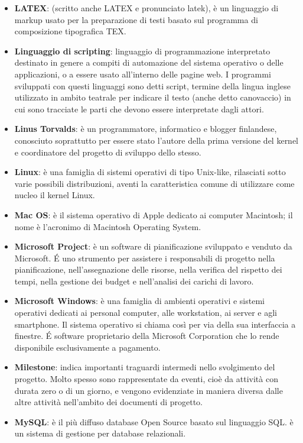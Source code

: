 \begin{itemize}
\item[] \textbf{LATEX}:  (scritto anche LATEX e pronunciato latek), è un linguaggio di markup usato per la preparazione di testi basato sul programma di composizione tipografica TEX.
\item[] \textbf{Linguaggio di scripting}: linguaggio di programmazione interpretato destinato in genere a compiti di automazione del sistema operativo o delle applicazioni, o a essere usato all'interno delle pagine web. I programmi sviluppati con questi linguaggi sono detti script, termine della lingua inglese utilizzato in ambito teatrale per indicare il testo (anche detto canovaccio) in cui sono tracciate le parti che devono essere interpretate dagli attori.
\item[] \textbf{Linus Torvalds}: è un programmatore, informatico e blogger finlandese, conosciuto soprattutto per essere stato l'autore della prima versione del kernel  e coordinatore del progetto di sviluppo dello stesso.
\item[] \textbf{Linux}: è una famiglia di sistemi operativi di tipo Unix-like, rilasciati sotto varie possibili distribuzioni, aventi la caratteristica comune di utilizzare come nucleo il kernel Linux.
\end{itemize}
\newpage

\begin{itemize}
\item[] \textbf{Mac OS}: è il sistema operativo di Apple dedicato ai computer Macintosh; il nome è l'acronimo di Macintosh Operating System.
\item[] \textbf{Microsoft Project}: è un software di pianificazione sviluppato e venduto da Microsoft. \'E uno strumento per assistere i responsabili di progetto nella pianificazione, nell'assegnazione delle risorse, nella verifica del rispetto dei tempi, nella gestione dei budget e nell'analisi dei carichi di lavoro.
\item[] \textbf{Microsoft Windows}: è una famiglia di ambienti operativi e sistemi operativi dedicati ai personal computer, alle workstation, ai server e agli smartphone. Il sistema operativo si chiama così per via della sua interfaccia a finestre. É software proprietario della Microsoft Corporation che lo rende disponibile esclusivamente a pagamento.
\item[] \textbf{Milestone}: indica importanti traguardi intermedi nello svolgimento del progetto. Molto spesso sono rappresentate da eventi, cioè da attività con durata zero o di un giorno, e vengono evidenziate in maniera diversa dalle altre attività nell'ambito dei documenti di progetto.
\item[] \textbf{MySQL}: è il più diffuso database Open Source basato sul linguaggio SQL.  è un sistema di gestione per database relazionali.
\end{itemize}
\newpage

